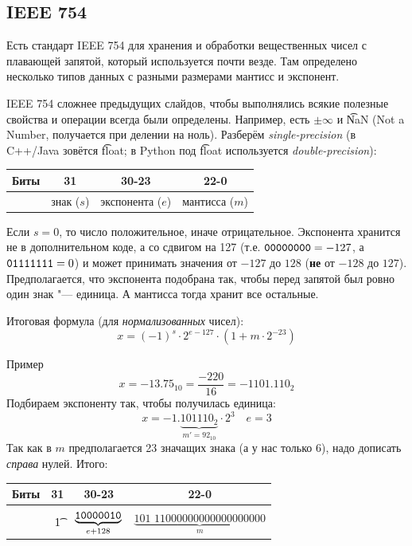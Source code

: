 \subsection{IEEE 754}
\begin{frame}
\end{frame}

\begin{frame}
	Есть стандарт IEEE 754 для хранения и обработки вещественных чисел с плавающей запятой, который используется почти везде.
	Там определено несколько типов данных с разными размерами мантисс и экспонент.

	IEEE 754 сложнее предыдущих слайдов, чтобы выполнялись всякие полезные свойства и операции всегда были определены.
	Например, есть $\pm \infty$ и \t{NaN} (Not a Number, получается при делении на ноль).
	Разберём \textit{single-precision} (в C++/Java зовётся \t{float}; в Python под \t{float} используется \textit{double-precision}):

	\begin{center}
		\begin{tabular}{|r|c|c|c|}
			\hline
			Биты & 31 & 30-23 & 22-0 \\\hline
			& знак ($s$) & экспонента ($e$) & мантисса ($m$) \\\hline
		\end{tabular}
	\end{center}
	Если $s=0$, то число положительное, иначе отрицательное.
	Экспонента хранится не в дополнительном коде, а со сдвигом на 127 (т.е. $\t{0000 0000}=-127$, а $\t{0111 1111}=0$)
	и может принимать значения от $-127$ до $128$ (\textbf{не} от $-128$ до $127$).
	Предполагается, что экспонента подобрана так, чтобы перед запятой был ровно один знак "--- единица.
	А мантисса тогда хранит все остальные.

	Итоговая формула (для \textit{нормализованных} чисел):
	\[
		x = (-1)^s \cdot 2^{e-127} \cdot (1 + m \cdot 2^{-23})
	\]
\end{frame}

\begin{frame}{Пример}
	\[
		x = -13.75_{10} = \frac{-220}{16} = -1101.110_2
	\]
	Подбираем экспоненту так, чтобы получилась единица:
	\[
		x = -1.\underbrace{101110_2}_{m'=92_{10}} \cdot 2^3 \quad e=3
	\]
	Так как в $m$ предполагается 23 значащих знака (а у нас только 6), надо дописать \textit{справа} нулей.
	Итого:
	\begin{center}
		\begin{tabular}{|r|c|c|c|}
			\hline
			Биты & 31 & 30-23 & 22-0 \\\hline
			& \t{1} & $\underbrace{\t{100 0001 0}}_{e+128}$ & $\underbrace{\textit{101 110}0 0000 0000 0000 0000}_{m}$ \\\hline
		\end{tabular}
	\end{center}	
\end{frame}

